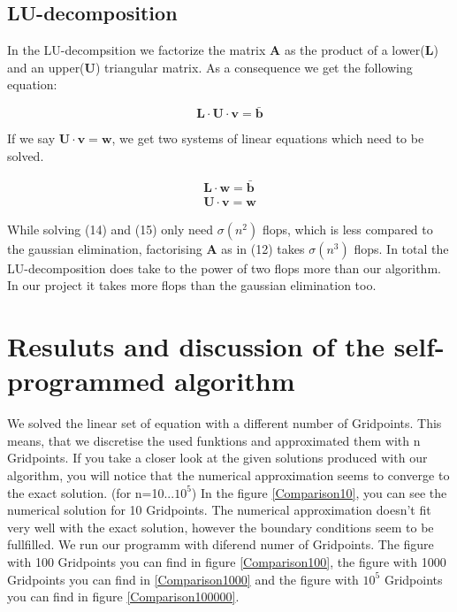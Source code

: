 \documentclass[10pt,a4paper]{article}
\begin{document}
\subsection{LU-decomposition}

In the LU-decompsition we factorize the matrix $\mathbf A$ as the product of a lower($\mathbf L$) and an upper($\mathbf{U}$) triangular matrix. As a consequence we get the following equation:

\begin{equation}
\mathbf{L \cdot U \cdot v = \bar{b}}
\end{equation}

If we say $\mathbf{U \cdot v = w}$, we get two systems of linear equations which need to be solved.

\begin{gather}
\mathbf{L \cdot w = \bar{b}} \\
\mathbf{U \cdot v = w}
\end{gather}

While solving (14) and (15) only need $\sigma(n^2)$ flops, which is less compared to the gaussian elimination, factorising $\mathbf{A}$ as in (12) takes $\sigma(n^3)$ flops. In total the LU-decomposition does take to the power of two flops more than our algorithm. In our project it takes more flops than the gaussian elimination too.


\section{Resuluts and discussion of the self-programmed algorithm}

We solved the linear set of equation with a different number of Gridpoints. This means, that we discretise the used funktions and approximated them with n Gridpoints. If you take a closer look at the given solutions produced with our algorithm, you will notice that the numerical approximation seems to converge to the exact solution. (for n=10...$10^5$) In the figure \ref{Comparison10}, you can see the numerical solution for 10 Gridpoints. The numerical approximation doesn't fit very well with the exact solution, however the boundary conditions seem to be fullfilled. We run our programm with diferend numer of Gridpoints. The figure with 100 Gridpoints you can find in figure \ref{Comparison100}, the figure with 1000 Gridpoints you can find in \ref{Comparison1000} and the figure with $10^5$ Gridpoints you can find in figure \ref{Comparison100000}. 
\end{document}
